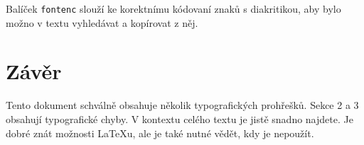\documentclass[10pt,a4paper,twocolumn]{article}
\begin{document}
Balíček \texttt{fontenc} slouží ke korektnímu kódovaní znaků s diakritikou, aby bylo možno v textu vyhledávat a kopírovat z něj.

\section{Závěr}
Tento dokument schválně obsahuje několik typografických prohřešků.
Sekce 2 a 3 obsahují typografické chyby.
V kontextu celého textu je jistě snadno najdete.
Je dobré znát možnosti {\LaTeX u}, ale je také nutné vědět, kdy je nepoužít.
\end{document}
